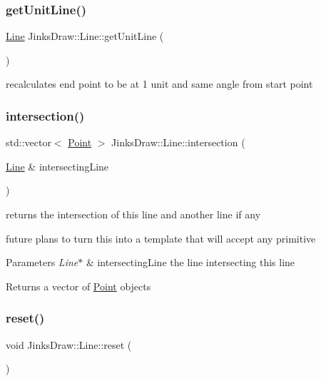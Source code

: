 \subsubsection{\texorpdfstring{get\+Unit\+Line()}{getUnitLine()}}
{\footnotesize\ttfamily \mbox{\hyperlink{class_jinks_draw_1_1_line}{Line}} Jinks\+Draw\+::\+Line\+::get\+Unit\+Line (\begin{DoxyParamCaption}{ }\end{DoxyParamCaption})}



recalculates end point to be at 1 unit and same angle from start point 

\mbox{\label{class_jinks_draw_1_1_line_a159d4850578aff530064d53c7461fa03}} 
\subsubsection{\texorpdfstring{intersection()}{intersection()}}
{\footnotesize\ttfamily std\+::vector$<$ \mbox{\hyperlink{class_jinks_draw_1_1_point}{Point}} $>$ Jinks\+Draw\+::\+Line\+::intersection (\begin{DoxyParamCaption}\item[{\mbox{\hyperlink{class_jinks_draw_1_1_line}{Line}} \&}]{intersecting\+Line }\end{DoxyParamCaption})}



returns the intersection of this line and another line if any 

future plans to turn this into a template that will accept any primitive 
\begin{DoxyParams}{Parameters}
{\em Line$\ast$} & intersecting\+Line the line intersecting this line \\
\hline
\end{DoxyParams}
\begin{DoxyReturn}{Returns}
a vector of \mbox{\hyperlink{class_jinks_draw_1_1_point}{Point}} objects 
\end{DoxyReturn}
\mbox{\label{class_jinks_draw_1_1_line_a95823711fb1ebc27435aff387c42b577}} 
\subsubsection{\texorpdfstring{reset()}{reset()}}
{\footnotesize\ttfamily void Jinks\+Draw\+::\+Line\+::reset (\begin{DoxyParamCaption}{ }\end{DoxyParamCaption})}



